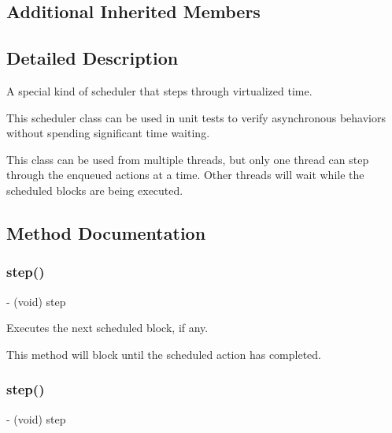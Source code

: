 \subsection*{Additional Inherited Members}


\subsection{Detailed Description}
A special kind of scheduler that steps through virtualized time.

This scheduler class can be used in unit tests to verify asynchronous behaviors without spending significant time waiting.

This class can be used from multiple threads, but only one thread can {\ttfamily step} through the enqueued actions at a time. Other threads will wait while the scheduled blocks are being executed. 

\subsection{Method Documentation}
\mbox{\label{interface_r_a_c_test_scheduler_a178d7eadc1d9f6a24e228dbc725d1ede}} 
\subsubsection{\texorpdfstring{step()}{step()}\hspace{0.1cm}{\footnotesize\ttfamily [1/3]}}
{\footnotesize\ttfamily -\/ (void) step \begin{DoxyParamCaption}{ }\end{DoxyParamCaption}}

Executes the next scheduled block, if any.

This method will block until the scheduled action has completed. \mbox{\label{interface_r_a_c_test_scheduler_a178d7eadc1d9f6a24e228dbc725d1ede}} 
\subsubsection{\texorpdfstring{step()}{step()}\hspace{0.1cm}{\footnotesize\ttfamily [2/3]}}
{\footnotesize\ttfamily -\/ (void) step \begin{DoxyParamCaption}{ }\end{DoxyParamCaption}}

